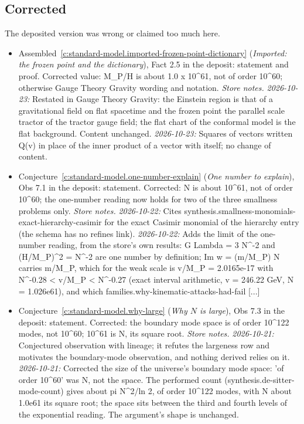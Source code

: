\documentclass[11pt]{article}
\theoremstyle{definition}
\theoremstyle{plain}
\begin{document}
\subsection*{Corrected}
The deposited version was wrong or claimed too much here.
\begin{itemize}\setlength{\itemsep}{2pt}
\item Assembled~\ref{c:standard-model.imported-frozen-point-dictionary} (\emph{Imported: the frozen point and the dictionary}), Fact 2.5 in the deposit: statement and proof. Corrected value: M\_P/H is about 1.0 x 10\^{}61, not of order 10\^{}60; otherwise Gauge Theory Gravity wording and notation. \emph{Store notes.} \emph{2026-10-23:} Restated in Gauge Theory Gravity: the Einstein region is that of a gravitational field on flat spacetime and the frozen point the parallel scale tractor of the tractor gauge field; the flat chart of the conformal model is the flat background. Content unchanged. \emph{2026-10-23:} Squares of vectors written Q(v) in place of the inner product of a vector with itself; no change of content.
\item Conjecture~\ref{c:standard-model.one-number-explain} (\emph{One number to explain}), Obs 7.1 in the deposit: statement. Corrected: N is about 10\^{}61, not of order 10\^{}60; the one-number reading now holds for two of the three smallness problems only. \emph{Store notes.} \emph{2026-10-22:} Cites synthesis.smallness-monomials-exact-hierarchy-casimir for the exact Casimir monomial of the hierarchy entry (the schema has no refines link). \emph{2026-10-22:} Adds the limit of the one-number reading, from the store's own results: G Lambda = 3 N\^{}-2 and (H/M\_P)\^{}2 = N\^{}-2 are one number by definition; Im w = (m/M\_P) N carries m/M\_P, which for the weak scale is v/M\_P = 2.0165e-17 with N\^{}-0.28 < v/M\_P < N\^{}-0.27 (exact interval arithmetic, v = 246.22 GeV, N = 1.026e61), and which families.why-kinematic-attacks-had-fail [...]
\item Conjecture~\ref{c:standard-model.why-large} (\emph{Why $N$ is large}), Obs 7.3 in the deposit: statement. Corrected: the boundary mode space is of order 10\^{}122 modes, not 10\^{}60; 10\^{}61 is N, its square root. \emph{Store notes.} \emph{2026-10-21:} Conjectured observation with lineage; it refutes the largeness row and motivates the boundary-mode observation, and nothing derived relies on it. \emph{2026-10-21:} Corrected the size of the universe's boundary mode space: 'of order 10\^{}60' was N, not the space. The performed count (synthesis.de-sitter-mode-count) gives about pi N\^{}2/ln 2, of order 10\^{}122 modes, with N about 1.0e61 its square root; the space sits between the third and fourth levels of the exponential reading. The argument's shape is unchanged.

\end{itemize}
\end{document}
